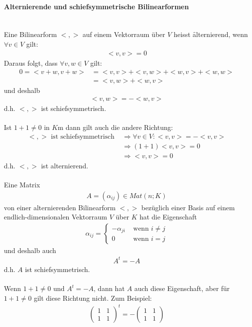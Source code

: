 \paragraph{Alternierende und schiefsymmetrische Bilinearformen} {\ \\}
Eine Bilinearform $<, >$ auf einem Vektorraum über $V$ heisst \f{alternierend}, wenn $\forall v \in V$ gilt:
\begin{align}
<v, v> = 0
\end{align}
Daraus folgt, dass $\forall v, w \in V$ gilt:
\begin{align}
0 = <v+w, v+w> &= <v, v> + <v, w> + <w, v> + <w, w> \\
&= <v, w> + <w, v>
\end{align}
und deshalb
\begin{align}
<v, w> = - <w, v>
\end{align}
d.h. $<, >$ ist schiefsymmetrisch.\\\\
Ist $1+1 \neq 0$ in $K$m dann gilt auch die andere Richtung:
\begin{align}
<,> \text{ ist schiefsymmetrisch } &\Rightarrow \forall v \in V: <v, v> = -<v, v> \\
&\Rightarrow (1+1) <v, v> = 0 \\
&\Rightarrow <v, v> = 0
\end{align}
d.h. $<, >$ ist alternierend.\\\\
Eine Matrix
\begin{align}
A = (\alpha_{ij}) \in Mat(n;K)
\end{align}
von einer alternierenden Bilinearform $<, >$ bezüglich einer Basis auf einem endlich-dimensionalen Vektorraum $V$ über $K$ hat die Eigenschaft
\begin{align}
\alpha_{ij} = \left\{\begin{matrix} -\alpha_{ji} & \text{ wenn } i \neq j \\ 0 & \text{ wenn } i = j \end{matrix} \right.
\end{align}
und deshalb auch
\begin{align}
A^t = -A
\end{align}
d.h. $A$ ist schiefsymmetrisch.\\\\
Wenn $1+1 \neq 0$ und $A^t = -A$, dann hat $A$ auch diese Eigenschaft, aber für $1+1 \neq 0$ gilt diese Richtung nicht. Zum Beispiel:
\begin{align}
\begin{pmatrix} 1 & 1 \\ 1 & 1\end{pmatrix}^t = - \begin{pmatrix}1 & 1 \\ 1 & 1\end{pmatrix}
\end{align}
